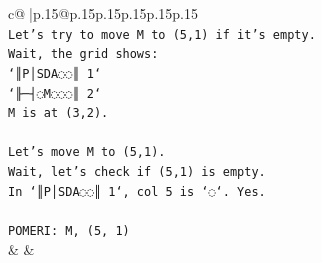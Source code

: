 \documentclass{article}
\begin{document}
{\begin{supertabular}{c@{$\;$}|p{.15\linewidth}@{}p{.15\linewidth}p{.15\linewidth}p{.15\linewidth}p{.15\linewidth}p{.15\linewidth}}
{{{\\ 
\texttt{Let's try to move M to (5,1) if it's empty.} \\
\texttt{Wait, the grid shows:} \\
\texttt{`║P│SDA◌◌║ 1`} \\
\texttt{`╟─┤◌M◌◌◌║ 2`} \\
\texttt{M is at (3,2).} \\
\\ 
\texttt{Let's move M to (5,1).} \\
\texttt{Wait, let's check if (5,1) is empty.} \\
\texttt{In `║P│SDA◌◌║ 1`, col 5 is `◌`. Yes.} \\
\\ 
\texttt{POMERI: M, (5, 1)} \\
            }
        }
    }
    & & \\ \\


\end{supertabular}}
\end{document}
